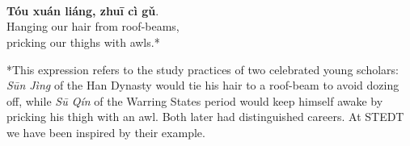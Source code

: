 \section*{}

\hfill
\hfill
\begin{minipage}[c]{0.3\linewidth}
\\
\textbf{Tóu xuán liáng, zhuī cì gǔ}.\\
Hanging our hair from roof-beams,\\
pricking our thighs with awls.*
\end{minipage}
\hfill
\hfill

\bigskip

\bigskip

\bigskip

\bigskip

\hfill
\begin{minipage}[c]{0.3\linewidth}
*This expression refers to the study practices of two celebrated young scholars: \textit{Sūn Jìng}  of the Han Dynasty would tie his hair to a roof-beam to avoid dozing off, while \textit{Sū Qín}  of the Warring States period would keep himself awake by pricking his thigh with an awl. Both later had distinguished careers. At STEDT we have been inspired by their example.
\end{minipage}
\hfill
\hfill

